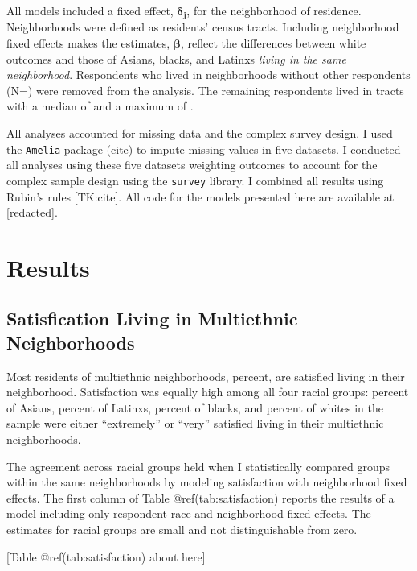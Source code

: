 \documentclass{baderart}
\begin{document}
All models included a fixed effect, \(\mathbf{\delta_j}\), for the neighborhood of residence. Neighborhoods were defined as residents' census tracts. Including neighborhood fixed effects makes the estimates, \(\mathbf{\beta}\), reflect the differences between white outcomes and those of Asians, blacks, and Latinxs \emph{living in the same neighborhood}. Respondents who lived in neighborhoods without other respondents (N=\oneresp) were removed from the analysis. The remaining respondents lived in tracts with a median of \medNpertract and a maximum of \maxNpertract.

All analyses accounted for missing data and the complex survey design. I used the \texttt{Amelia} package (cite) to impute missing values in five datasets. I conducted all analyses using these five datasets weighting outcomes to account for the complex sample design using the \texttt{survey} library. I combined all results using Rubin's rules {[}TK:cite{]}. All code for the models presented here are available at {[}redacted{]}.

\section{Results}\label{results}

\subsection{Satisfication Living in Multiethnic Neighborhoods}\label{satisfication-living-in-multiethnic-neighborhoods}

Most residents of multiethnic neighborhoods, \meansatisfied percent, are satisfied living in their neighborhood. Satisfaction was equally high among all four racial groups: \apisatisfied percent of Asians, \hspsatisfied percent of Latinxs, \nhbsatisfied percent of blacks, and \nhwsatisfied percent of whites in the sample were either ``extremely'' or ``very'' satisfied living in their multiethnic neighborhoods.

The agreement across racial groups held when I statistically compared groups within the same neighborhoods by modeling satisfaction with neighborhood fixed effects. The first column of Table @ref(tab:satisfaction) reports the results of a model including only respondent race and neighborhood fixed effects. The estimates for racial groups are small and not distinguishable from zero.

{[}Table @ref(tab:satisfaction) about here{]}
\end{document}
